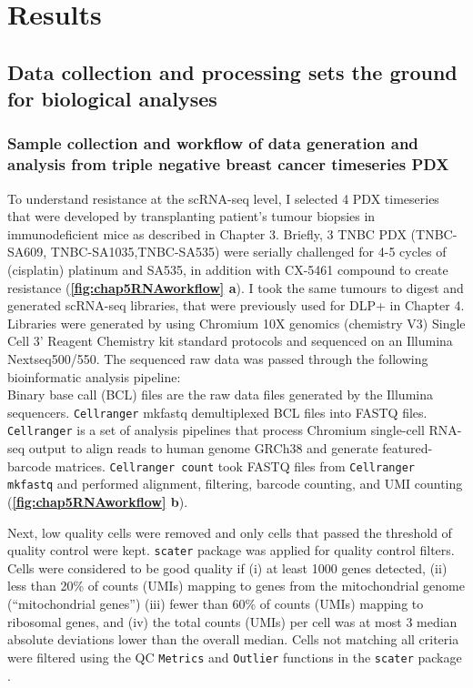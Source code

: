 \section{Results}
 
\subsection{Data collection and processing sets the ground for biological analyses} 
  
\subsubsection{Sample collection and workflow of data generation and analysis from triple negative breast cancer timeseries PDX}
To understand resistance at the scRNA-seq level, I selected 4 PDX timeseries that were developed by transplanting patient's tumour biopsies in immunodeficient mice as described in Chapter 3. 
Briefly, 3 TNBC PDX (TNBC-SA609, TNBC-SA1035,TNBC-SA535) were serially challenged for 4-5 cycles of (cisplatin) platinum and SA535, in addition with CX-5461 compound to create resistance (\textbf{\autoref{fig:chap5RNAworkflow} a}).
 I took the same tumours to digest and generated scRNA-seq libraries, that were previously used for DLP+ in Chapter 4. Libraries were generated by using Chromium 10X genomics (chemistry V3) Single Cell 3' Reagent Chemistry kit standard protocols and sequenced on an Illumina Nextseq500/550. The sequenced raw data was passed through the following bioinformatic analysis pipeline: 
\\
Binary base call (BCL) files are the raw data files generated by the Illumina sequencers. \texttt{Cellranger} mkfastq demultiplexed BCL files into FASTQ files. \texttt{Cellranger} is a set of analysis pipelines that process Chromium single-cell RNA-seq output to align reads to human genome GRCh38 and generate featured-barcode matrices. \texttt{Cellranger count} took FASTQ files from \texttt{Cellranger mkfastq} and performed alignment, filtering, barcode counting, and UMI counting (\textbf{\autoref{fig:chap5RNAworkflow} b}). 

Next, low quality cells were removed and only cells that passed the threshold of quality control were kept. 
 \texttt{scater} package was applied for quality control filters. Cells were considered to be good quality if (i) at least 1000 genes detected, (ii) less than 20\% of counts (UMIs) mapping to genes from the mitochondrial genome (``mitochondrial genes'') (iii) fewer than 60\% of counts (UMIs) mapping to ribosomal genes, and (iv) the total counts (UMIs) per cell was at most 3 median absolute deviations lower than the overall median. Cells not matching all criteria were filtered using the \ac{QC} \texttt{Metrics} and \texttt{Outlier} functions in the \texttt{scater} package \cite{mccarthy2017scater}.

